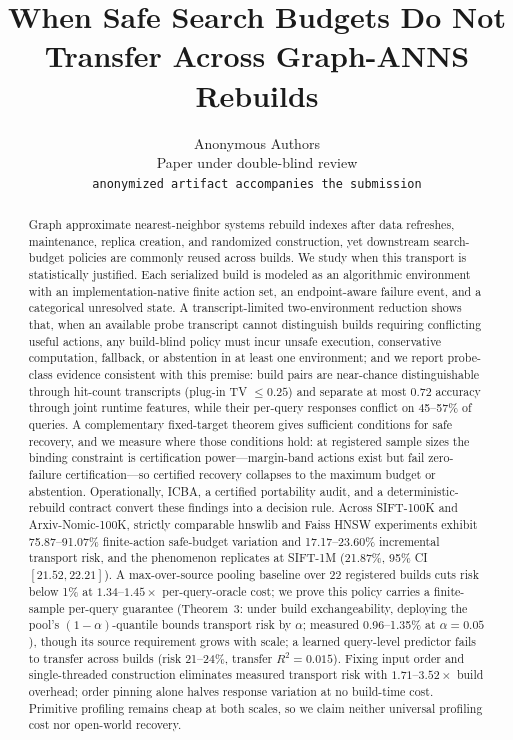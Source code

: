 \documentclass{article}
\title{When Safe Search Budgets Do Not Transfer Across Graph-ANNS Rebuilds}
\author{Anonymous Authors\\
Paper under double-blind review\\
\texttt{anonymized artifact accompanies the submission}}
\begin{document}
\maketitle

\begin{abstract}
Graph approximate nearest-neighbor systems rebuild indexes after data refreshes, maintenance, replica
creation, and randomized construction, yet downstream search-budget policies are commonly reused across
builds. We study when this transport is statistically justified. Each serialized build is modeled as an
algorithmic environment with an implementation-native finite action set, an endpoint-aware failure event,
and a categorical unresolved state. A transcript-limited two-environment reduction shows that, when an
available probe transcript cannot distinguish builds requiring conflicting useful actions, any build-blind
policy must incur unsafe execution, conservative computation, fallback, or abstention in at least one
environment; and we report probe-class evidence consistent with this premise: build pairs are
near-chance distinguishable through hit-count transcripts (plug-in TV $\le0.25$) and separate at most
$0.72$ accuracy through joint runtime features, while their per-query responses conflict on 45--57\% of
queries. A complementary fixed-target theorem gives sufficient conditions for safe recovery, and
we measure where those conditions hold: at registered sample sizes the binding constraint is
certification power---margin-band actions exist but fail zero-failure certification---so certified recovery
collapses to the maximum budget or abstention. Operationally, ICBA, a
certified portability audit, and a deterministic-rebuild contract convert these findings into a decision
rule. Across SIFT-100K and Arxiv-Nomic-100K, strictly comparable hnswlib and Faiss HNSW experiments exhibit
75.87--91.07\% finite-action safe-budget variation and 17.17--23.60\% incremental transport risk, and the
phenomenon replicates at SIFT-1M (21.87\%, 95\% CI $[21.52, 22.21]$). A max-over-source pooling baseline over
22 registered builds cuts risk below 1\% at $1.34$--$1.45\times$ per-query-oracle cost; we prove this
policy carries a finite-sample per-query guarantee (Theorem~3: under build exchangeability, deploying the
pool's $(1{-}\alpha)$-quantile bounds transport risk by $\alpha$; measured 0.96--1.35\% at
$\alpha{=}0.05$), though its source requirement grows with scale; a learned query-level predictor fails to
transfer across builds (risk 21--24\%, transfer $R^2 = 0.015$). Fixing input order and single-threaded construction eliminates measured transport
risk with $1.71$--$3.52\times$ build overhead; order pinning alone halves response variation at no build-time
cost. Primitive profiling remains cheap at both scales, so we claim neither universal profiling cost nor
open-world recovery.
\end{abstract}
\end{document}
